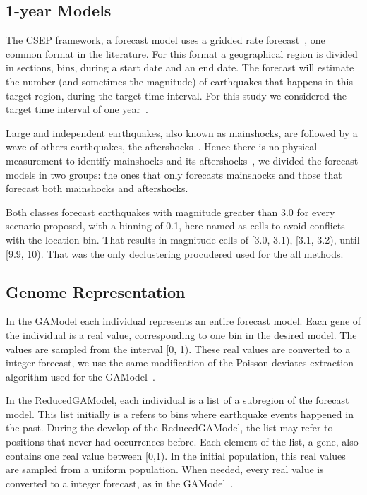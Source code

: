 \subsection{1-year Models}
The CSEP framework, a forecast model uses a gridded rate
forecast~\cite{zechar2010evaluating}, one common format in the
literature. For this format a geographical region is divided in
sections, bins, during a start date and an end date. The forecast will
estimate the number (and sometimes the magnitude) of earthquakes that
happens in this target region, during the target time interval. For
this study we considered the target time interval of one
year~\cite{ecta14}.

Large and independent earthquakes, also known as mainshocks, are
followed by a wave of others earthquakes, the
aftershocks~\cite{schorlemmer2010first}. Hence there is no physical
measurement to identify mainshocks and its
aftershocks~\cite{schorlemmer2010first}, we divided the forecast
models in two groups: the ones that only forecasts mainshocks and
those that forecast both mainshocks and aftershocks.

Both classes forecast earthquakes with magnitude greater than 3.0 for
every scenario proposed, with a binning of 0.1, here named as cells to
avoid conflicts with the location bin. That results in magnitude cells
of [3.0, 3.1), [3.1, 3.2), until [9.9, 10). That was the only
declustering procudered used for the all methods.

\subsection{Genome Representation}\label{genome}
In the GAModel each individual represents an entire forecast
model. Each gene of the individual is a real value, corresponding to
one bin in the desired model. The values are sampled from the interval
[0, 1). These real values are converted to a integer forecast, we use
  the same modification of the Poisson deviates extraction algorithm
  used for the GAModel~\cite{ecta14}.

In the ReducedGAModel, each individual is a list of a subregion of the
forecast model. This list initially is a refers to bins where
earthquake events happened in the past. During the develop of the
ReducedGAModel, the list may refer to positions that never had
occurrences before. Each element of the list, a gene, also contains
one real value between [0,1). In the initial population, this real
values are sampled from a uniform population. When needed, every
real value is converted to a integer forecast, as in the
GAModel~\cite{ecta14}.

